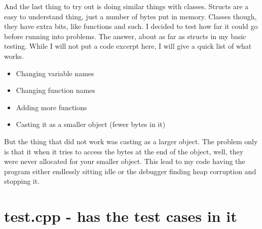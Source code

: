 \documentclass[12pt]{article}
\begin{document}
And the last thing to try out is doing similar things with classes.
Structs are a easy to understand thing, just a number of bytes put in memory.
Classes though, they have extra bits, like functions and such.
I decided to test how far it could go before running into problems.
The answer, about as far as structs in my basic testing.
While I will not put a code excerpt here, I will give a quick list of what works.

\begin{itemize}
	\item Changing variable names
	\item Changing function names
	\item Adding more functions
	\item Casting it as a smaller object (fewer bytes in it)
\end{itemize}

But the thing that did not work was casting as a larger object.
The problem only is that it when it tries to access the bytes at the end of the object, well, they were never allocated for your smaller object.
This lead to my code having the program either endlessly sitting idle or the debugger finding heap corruption and stopping it.

\appendix
\newpage
\section{test.cpp - has the test cases in it}
\end{document}

